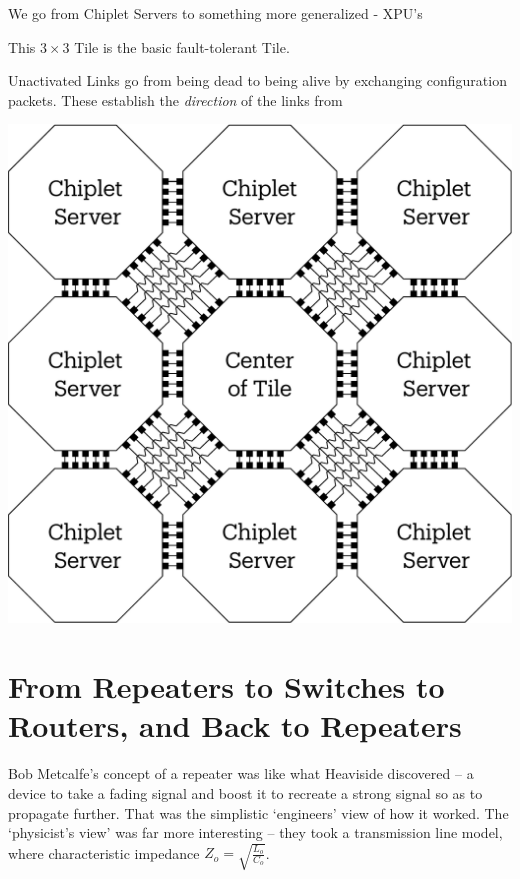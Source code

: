 We go from Chiplet Servers to something more generalized - XPU's 


This $3 \times 3$ Tile is the basic fault-tolerant Tile.


Unactivated Links go from being dead to being alive by exchanging configuration packets. These establish the \emph{direction} of the links from 


\clearpage
 
 \begin{marginfigure}
  \includegraphics[width=1.2\linewidth]{../../FIGURES/3x3-wire-hop-chiplets}
    \vspace{2em}
\end{marginfigure}

 
 \section{From Repeaters to Switches to Routers, and Back to Repeaters}
 
 Bob Metcalfe's concept of a repeater was like what Heaviside discovered -- a device to take a fading signal and boost it to recreate a strong signal so as to propagate further. That was the simplistic `engineers' view of how it worked.  The `physicist's view' was far more interesting -- they took a transmission line model, where characteristic impedance $Z_o = \sqrt{{\frac{L_o}{C_o}}}$. %
 
